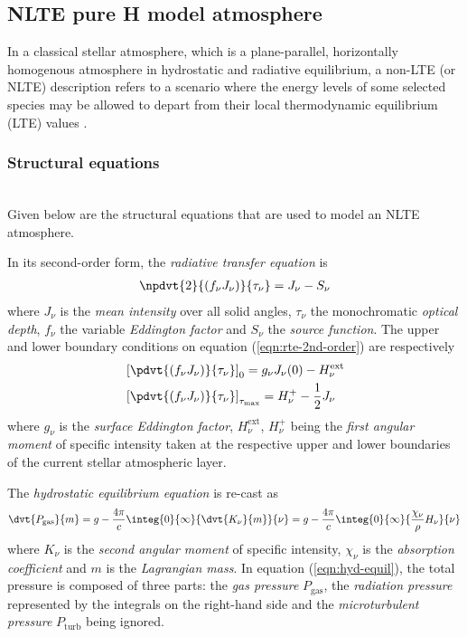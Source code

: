     \subsection{NLTE pure H model atmosphere}
    In a classical stellar atmosphere, which is a plane-parallel, horizontally homogenous atmosphere in hydrostatic and radiative equilibrium, a non-LTE (or NLTE) description refers to a scenario where the energy levels of some selected species may be allowed to depart from their local thermodynamic equilibrium (LTE) values \cite{hubeny2014theory}.
    	\subsubsection{Structural equations}
    	\quad\\	
	    Given below are the structural equations that are used to model an NLTE atmosphere.
	   
		In its second-order form, the \textit{radiative transfer equation} is
		\begin{align}
			\npdvt{2}{(f_\nu J_\nu)}{\tau_\nu}=J_\nu-S_\nu \label{eqn:rte-2nd-order}
		\end{align}
		where $J_\nu$ is the \textit{mean intensity} over all solid angles, $\tau_\nu$ the monochromatic \textit{optical depth}, $f_\nu$ the variable \textit{Eddington factor} and $S_\nu$ the \textit{source function}. The upper and lower boundary conditions on equation (\ref{eqn:rte-2nd-order}) are respectively
		\begin{align}
			&\left[ \pdvt{(f_\nu J_\nu)}{\tau_\nu} \right]_0=g_\nu J_\nu(0)-H_\nu^\text{ext} \label{eqn:rte-upper-bc} \\
			&\left[ \pdvt{(f_\nu J_\nu)}{\tau_\nu} \right]_{\tau_\text{max}}=H_\nu^+-\dfrac{1}{2}J_\nu \label{eqn:rte-lower-bc}
		\end{align}
		where $g_\nu$ is the \textit{surface Eddington factor}, $H_\nu^\text{ext}$, $H_\nu^+$ being the \textit{first angular moment} of specific intensity taken at the respective upper and lower boundaries of the current stellar atmospheric layer.
		
		The \textit{hydrostatic equilibrium equation} is re-cast as
		\begin{align}
			\dvt{P_\text{gas}}{m}=g-\dfrac{4\pi}{c}\integ{0}{\infty}{\dvt{K_\nu}{m}}{\nu}=g-\dfrac{4\pi}{c}\integ{0}{\infty}{\dfrac{\chi_\nu}{\rho}H_\nu}{\nu} \label{eqn:hyd-equil}
		\end{align}
		where $K_\nu$ is the \textit{second angular moment} of specific intensity, $\chi_\nu$ is the \textit{absorption coefficient} and $m$ is the \textit{Lagrangian mass}. In equation (\ref{eqn:hyd-equil}), the total pressure is composed of three parts: the \textit{gas pressure} $P_\text{gas}$, the \textit{radiation pressure} represented by the integrals on the right-hand side and the \textit{microturbulent pressure} $P_\text{turb}$ being ignored.
		

